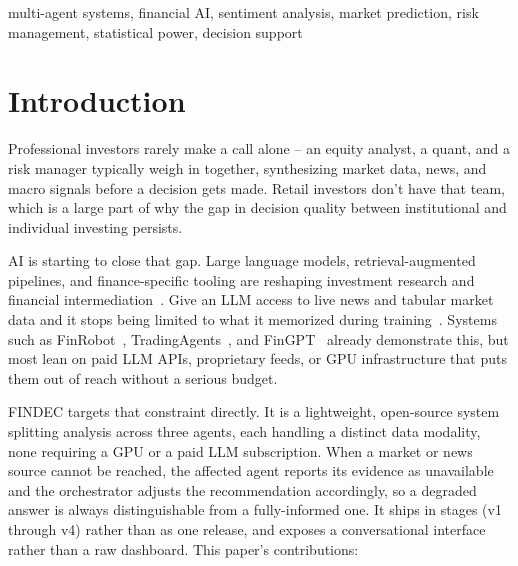 \documentclass[conference]{IEEEtran}
\begin{document}
\begin{IEEEkeywords}
multi-agent systems, financial AI, sentiment analysis, market prediction, risk management, statistical power, decision support
\end{IEEEkeywords}

\section{Introduction}

Professional investors rarely make a call alone -- an equity analyst, a quant, and a risk manager typically weigh in together, synthesizing market data, news, and macro signals before a decision gets made. Retail investors don't have that team, which is a large part of why the gap in decision quality between institutional and individual investing persists.

AI is starting to close that gap. Large language models, retrieval-augmented pipelines, and finance-specific tooling are reshaping investment research and financial intermediation~\cite{aldasoro2025intelligent, khan2025bridging}. Give an LLM access to live news and tabular market data and it stops being limited to what it memorized during training~\cite{qin2024toolllm, sinha2026finbloom}. Systems such as FinRobot~\cite{yang2024finrobot}, TradingAgents~\cite{xiao2024tradingagents}, and FinGPT~\cite{yang2023fingpt} already demonstrate this, but most lean on paid LLM APIs, proprietary feeds, or GPU infrastructure that puts them out of reach without a serious budget.

FINDEC targets that constraint directly. It is a lightweight, open-source system splitting analysis across three agents, each handling a distinct data modality, none requiring a GPU or a paid LLM subscription. When a market or news source cannot be reached, the affected agent reports its evidence as unavailable and the orchestrator adjusts the recommendation accordingly, so a degraded answer is always distinguishable from a fully-informed one. It ships in stages (v1 through v4) rather than as one release, and exposes a conversational interface rather than a raw dashboard. This paper's contributions:
\end{document}

